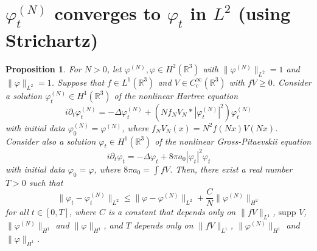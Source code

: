 \documentclass[11pt,a4paper]{scrartcl} %
\newtheorem{prp}[thm]{Proposition}
\newcommand{\R}{\mathds{R}}
\begin{document}
\section{$\varphi_t^{(N)}$ converges to $\varphi_t$ in $L^2$ (using
Strichartz)}


\begin{prp}
  \label{p:httogp}
  For $N > 0$, let $\varphi^{(N)}, \varphi \in H^2(\R^3)$ with $\|
  \varphi^{(N)} \|_{L^2} = 1$ and $\| \varphi \|_{L^2} = 1$. Suppose that $f
  \in L^1(\R^3)$ and $V \in C_c^\infty(\R^3)$ with $fV \ge 0$. Consider a
  solution $\varphi_t^{(N)} \in H^1(\R^3)$ of the nonlinear Hartree equation
  \begin{displaymath}
    i \partial_t \varphi_t^{(N)} = - \Delta \varphi_t^{(N)} + (N f_N V_N *
    |\varphi_t^{(N)}|^2) \varphi_t^{(N)}
  \end{displaymath}
  with initial data $\varphi^{(N)}_0 = \varphi^{(N)}$, where $f_N V_N(x) = N^2
  f(Nx)V(Nx)$. Consider also a solution $\varphi_t \in H^1(\R^3)$ of the
  nonlinear Gross-Pitaevskii equation
  \begin{displaymath}
    i \partial_t \varphi_t = - \Delta \varphi_t + 8 \pi a_0 |\varphi_t|^2
    \varphi_t
  \end{displaymath}
  with initial data $\varphi_0 = \varphi$, where $8 \pi a_0 = \int f V$. Then,
  there exist a real number $T > 0$ such that
  \begin{displaymath}
    \| \varphi_t - \varphi_t^{(N)} \|_{L^2} \le \| \varphi - \varphi^{(N)}
    \|_{L^2} + \frac{C}{N}\| \varphi^{(N)} \|_{H^2}
  \end{displaymath}
  for all $t \in [0,T]$, where $C$ is a constant that depends only on $\| fV
  \|_{L^1}$, $\text{supp }V$, $\| \varphi^{(N)} \|_{H^1}$ and $\| \varphi
  \|_{H^1}$, and $T$ depends only on $\| fV \|_{L^1}$, $\| \varphi^{(N)}
  \|_{H^1}$ and $\| \varphi \|_{H^1}$.
\end{prp}
\end{document}
